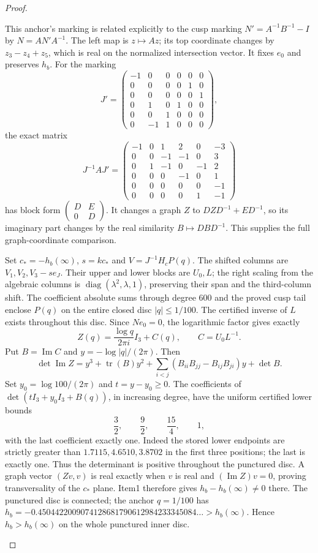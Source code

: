 \begin{proof}
\begin{enumerate}[label={$\langle1\rangle$\arabic*.}]
\[\]
This anchor's marking is related explicitly to the cusp marking $N'=A^{-1}B^{-1}-I$ by
$N=AN'A^{-1}$.
The left map is $z\mapsto Az$; its top coordinate changes
by $z_3-z_4+z_5$, which is real on the normalized intersection
vector.  It fixes $e_0$ and preserves $h_b$.
For the marking
\[
 J'=\begin{pmatrix}
 -1&0&0&0&0&0\\0&0&0&0&1&0\\0&0&0&0&0&1\\
 0&1&0&1&0&0\\0&0&1&0&0&0\\0&-1&1&0&0&0
 \end{pmatrix},
\]
the exact matrix
\[
 J^{-1}AJ'=
 \begin{pmatrix}
 -1&0&1&2&0&-3\\0&0&-1&-1&0&3\\0&1&-1&0&-1&2\\
 0&0&0&-1&0&1\\0&0&0&0&0&-1\\0&0&0&0&1&-1
 \end{pmatrix}
\]
has block form $\left(\begin{smallmatrix}D&E\\0&D\end{smallmatrix}\right)$.
It changes a graph $Z$ to $DZD^{-1}+ED^{-1}$, so its imaginary
part changes by the real similarity $B\mapsto DBD^{-1}$.
This supplies the full graph-coordinate comparison.

Set $c_*=-h_b(\infty)$, $s=kc_*$ and $V=J^{-1}H_cP(q)$.
The shifted columns are $V_1,V_2,V_3-se_J$.
Their upper and lower blocks are $U_0,L$; the right scaling
from the algebraic columns is
$\operatorname{diag}(\lambda^2,\lambda,1)$, preserving their
span and the third-column shift.
The coefficient absolute sums through degree 600 and the proved
cusp tail enclose $P(q)$ on the entire closed disc $|q|\le1/100$.
The certified inverse of $L$ exists throughout this disc.
Since $Ne_0=0$, the logarithmic factor gives exactly
\[
 Z(q)=\frac{\log q}{2\pi i}I_3+C(q),\qquad C=U_0L^{-1}.
\]
Put $B=\operatorname{Im}C$ and $y=-\log|q|/(2\pi)$. Then
\[
 \det\operatorname{Im}Z
 =y^3+\operatorname{tr}(B)y^2
  +\sum_{i<j}(B_{ii}B_{jj}-B_{ij}B_{ji})y+\det B.
 \tag{1.18.6}
\]
Set $y_0=\log100/(2\pi)$ and $t=y-y_0\ge0$.
The coefficients of
$\det(tI_3+y_0I_3+B(q))$, in increasing degree, have the
uniform certified lower bounds
\[
 \frac32,\qquad\frac92,\qquad\frac{15}4,\qquad1,
\]
with the last coefficient exactly one.
Indeed the stored lower endpoints are strictly greater than $1.7115,4.6510,3.8702$ in the first
three positions; the last is exactly one.
Thus the determinant is positive throughout the punctured disc.
A graph vector $(Zv,v)$ is real exactly when $v$ is real and
$(\operatorname{Im}Z)v=0$, proving transversality of the
$c_*$ plane. Item1 therefore gives
$h_b-h_b(\infty)\ne0$ there. The punctured disc is connected;
the anchor $q=1/100$ has
$h_b=-0.4504422009074128681790612984233345084\ldots>h_b(\infty)$.
Hence $h_b>h_b(\infty)$ on the whole punctured inner disc.


\end{enumerate}
\end{proof}
